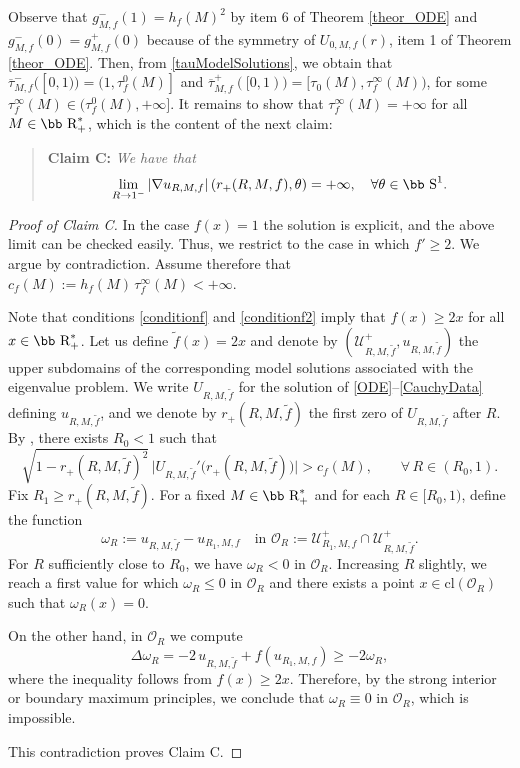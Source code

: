 \documentclass[11pt]{article}
\def\r{\hbox{\bb R}}
\def\s{\hbox{\bb S}}
\newcommand{\U}{\mathcal{U}}
\newcommand{\abs}[1]{\left\vert #1 \right\vert}
\numberwithin{equation} {section}
\begin{document}
Observe that $g_{M,f}^- (1)=h_f(M)^2$ by item 6 of Theorem \ref{theor_ODE} and $g_{M,f}^-  (0) = g_{M,f}^+ (0)$ because of the symmetry of $U_{0,M,f} (r)$, item 1 of Theorem \ref{theor_ODE}. Then, from \eqref{tauModelSolutions}, we obtain that $\overline{\tau} _{M,f}^-([0,1)) = (1, \tau _f^0 (M)]$ and $\overline{\tau} _{M,f}^+ ([0,1)) = [\tau _0 (M) , \tau_f^\infty (M))$, for some $\tau_f^\infty (M) \in (\tau_f^0 (M), + \infty]$. It remains to show that $\tau_f^\infty (M) = + \infty$ for all $M \in \r_+^*$, which is the content of the next claim:
\begin{quote}
	{\bf Claim C:} {\it We have that
		$$\displaystyle\lim_{R \to 1^-} \abs{\nabla u_{R,M,f}} (r_+(R,M,f),\theta ) =+\infty, \quad \forall \theta \in \s^{1}.$$}
\end{quote}
\begin{proof}[Proof of Claim C]
	In the case $f(x)=1$ the solution is explicit, and the above limit can be checked easily. Thus, we restrict to the case in which $f' \geq 2$. We argue by contradiction. Assume therefore that $c_f(M) := h_f(M)\,\tau_f^{\infty}(M) < +\infty.$

	Note that conditions \eqref{conditionf} and \eqref{conditionf2} imply that $f(x) \geq 2x$ for all $x \in \r_+^*$. Let us define $\tilde f(x)=2x$ and denote by $(\U_{R,M,\tilde{f}}^+,u_{R,M,\tilde{f}})$
	the upper subdomains of the corresponding model solutions associated with the eigenvalue problem. We write $ U_{R,M,\tilde f}$ for the solution of \eqref{ODE}--\eqref{CauchyData} defining $u_{R,M,\tilde f}$, and we denote by $r_+(R,M,\tilde f)$ the first zero of $ U_{R,M,\tilde f}$ after $R$. By \cite[Lemma~3.2]{EMa}, there exists $R_0<1$ such that
	\[
	\sqrt{1- r_+(R,M,\tilde f)^2}\,
	\bigl| U_{R,M,\tilde f}'\bigl( r_+(R,M,\tilde f)\bigr)\bigr|
	> c_f(M),
	\qquad \forall\, R\in (R_0,1).
	\]
	Fix $R_1\geq  r_+(R,M,\tilde f)$. For a fixed $M\in \r_+^*$ and for each
	$R\in [R_0,1)$, define the function
	\[
	\omega_R :=  u_{R,M,\tilde f}-u_{R_1,M,f}
	\quad \text{in } \mathcal O_R := \U_{R_1,M,f}^+ \cap \U_{R,M, \tilde f}^+ .
	\]
	For $R$ sufficiently close to $R_0$, we have $\omega_R<0$ in $\mathcal O_R$. Increasing $R$ slightly, we reach a first value for which $\omega_R \leq 0$ in $\mathcal O_R$ and there exists a point $x\in \mathrm{cl}(\mathcal O_R)$ such that
	$\omega_R(x)=0$.
	
	On the other hand, in $\mathcal O_R$ we compute
	\[
	\Delta \omega_R
	= -2\, u_{R,M,\tilde f} + f(u_{R_1,M,f})
	\geq -2 \omega_R,
	\]
	where the inequality follows from $f(x)\geq 2x$. Therefore, by the strong interior or boundary maximum principles, we conclude that $	\omega_R \equiv 0$ in $\mathcal{O}_R$,	which is impossible.
	
	This contradiction proves Claim C.
\end{proof}
\end{document}
